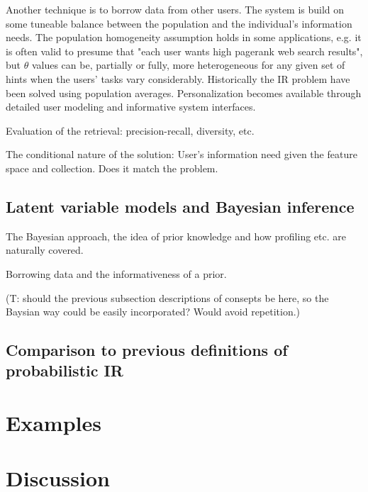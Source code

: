 \documentclass[10pt]{article}
\begin{document}
Another technique is to borrow data from other users. The system is build on some tuneable balance between the population and the individual's information needs. The population homogeneity assumption holds in some applications, e.g. it is often valid to presume that "each user wants high pagerank web search results", but $\theta$ values can be, partially or fully, more heterogeneous for any given set of hints when the users' tasks vary considerably. Historically the IR problem have been solved using population averages. Personalization becomes available through detailed user modeling and informative system interfaces.

Evaluation of the retrieval: precision-recall, diversity, etc.

The conditional nature of the solution: User's information need given the feature space and collection. Does it match the problem.

\subsection{Latent variable models and Bayesian inference}

The Bayesian approach, the idea of prior knowledge and how profiling etc. are naturally covered.

Borrowing data and the informativeness of a prior.

(T: should the previous subsection descriptions of consepts be here, so the Baysian way could be easily incorporated? Would avoid repetition.)
\subsection{Comparison to previous definitions of probabilistic IR}



\section{Examples}

\section{Discussion}
\end{document}
